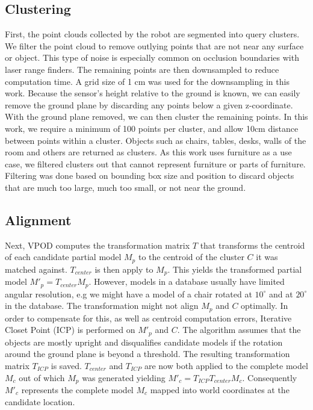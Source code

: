 \documentclass[letterpaper, 10pt, conference]{ieeeconf}
\begin{document}
\subsection{Clustering}
First, the point clouds collected by the robot are segmented into query
clusters. We filter the point cloud to remove outlying points that are not near any surface or object.  
This type of noise is especially common on occlusion boundaries with laser range finders.  
The remaining points are then downsampled to reduce computation time.  
A grid size of 1 cm was used for the downsampling in this work.  
Because the sensor's height relative to the ground is known, we can easily remove the ground plane by 
discarding any points below a given z-coordinate.  
With the ground plane removed, we can then cluster the remaining points. 
 In this work, we require a minimum of 100 points per cluster, and allow 10cm distance between points within a 
 cluster. Objects such as chairs, tables, desks, walls of the room and others
 are returned as clusters. As this work uses furniture as a use case, we
 filtered clusters out that cannot represent furniture or parts of furniture. Filtering was done based on bounding box size and position to
 discard objects that are much too large, much too small, or not near the ground.

\subsection{Alignment}
\label{alignment}
Next, VPOD computes the transformation
matrix $T$ that transforms the centroid of each candidate partial model $M_p$ to
the centroid of the cluster $C$ it was matched against. $T_{center}$ is then
apply to $M_p$. This yields the transformed partial model $M'_p=T_{center} M_p$. 
However, models in a database usually have limited angular resolution, e.g we 
might have a model of a chair rotated at $10^\circ$ and at $20^\circ$ in the database. 
The transformation might not align $M_p$ and $C$ optimally. In order to compensate for this, 
as well as centroid computation errors, Iterative Closet Point (ICP) \cite{ICP} is performed 
on $M'_p$ and $C$. The algorithm assumes that the objects are mostly upright and disqualifies 
candidate models if the rotation around the ground plane is beyond a threshold. 
The resulting transformation matrix $T_{ICP}$ is saved. $T_{center}$ and $T_{ICP}$ are 
now both applied to the complete model $M_c$ out of which $M_p$ was generated
yielding $M'_c=T_{ICP} T_{center} M_c$. Consequently $M'_c$ represents the
complete model $M_c$ mapped into world coordinates at the candidate location.
\end{document}
